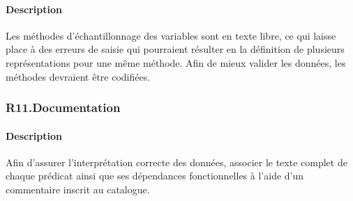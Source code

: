\documentclass{article}
\begin{document}
\paragraph{Description} Les méthodes d'échantillonnage des variables sont en texte libre, ce qui laisse place à des erreurs de saisie qui
pourraient résulter en la définition de plusieurs représentations pour une même méthode. Afin de mieux valider les données, les méthodes devraient être codifiées.


\subsubsection{R11.Documentation}
\paragraph{Description} Afin d'assurer l'interprétation correcte des données, associer
le texte complet de chaque prédicat ainsi que ses dépendances fonctionnelles à l'aide
d'un commentaire inscrit au catalogue.
\end{document}
